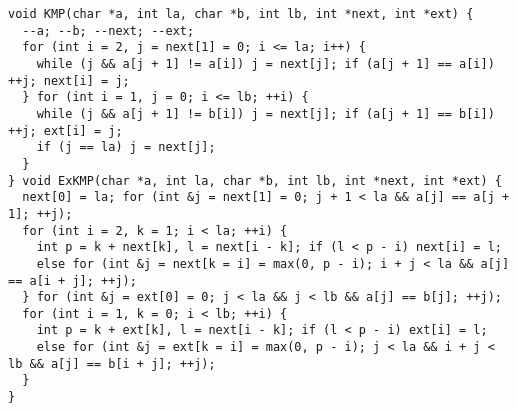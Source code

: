 \begin{lstlisting}
void KMP(char *a, int la, char *b, int lb, int *next, int *ext) {
  --a; --b; --next; --ext;
  for (int i = 2, j = next[1] = 0; i <= la; i++) {
    while (j && a[j + 1] != a[i]) j = next[j]; if (a[j + 1] == a[i]) ++j; next[i] = j;
  } for (int i = 1, j = 0; i <= lb; ++i) {
    while (j && a[j + 1] != b[i]) j = next[j]; if (a[j + 1] == b[i]) ++j; ext[i] = j;
    if (j == la) j = next[j];
  }
} void ExKMP(char *a, int la, char *b, int lb, int *next, int *ext) {
  next[0] = la; for (int &j = next[1] = 0; j + 1 < la && a[j] == a[j + 1]; ++j);
  for (int i = 2, k = 1; i < la; ++i) {
    int p = k + next[k], l = next[i - k]; if (l < p - i) next[i] = l;
    else for (int &j = next[k = i] = max(0, p - i); i + j < la && a[j] == a[i + j]; ++j);
  } for (int &j = ext[0] = 0; j < la && j < lb && a[j] == b[j]; ++j);
  for (int i = 1, k = 0; i < lb; ++i) {
    int p = k + ext[k], l = next[i - k]; if (l < p - i) ext[i] = l;
    else for (int &j = ext[k = i] = max(0, p - i); j < la && i + j < lb && a[j] == b[i + j]; ++j);
  }
}
\end{lstlisting}
